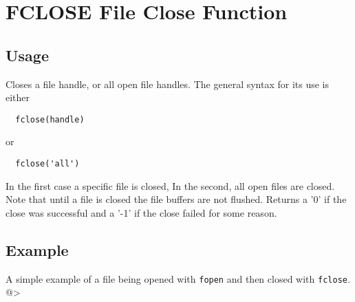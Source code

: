 \section{FCLOSE File Close Function}

\subsection{Usage}

Closes a file handle, or all open file handles.  The general syntax
for its use is either
\begin{verbatim}
  fclose(handle)
\end{verbatim}
or
\begin{verbatim}
  fclose('all')
\end{verbatim}
In the first case a specific file is closed,  In the second, all open
files are closed.  Note that until a file is closed the file buffers
are not flushed.  Returns a '0' if the close was successful and a '-1' if
the close failed for some reason.
\subsection{Example}

A simple example of a file being opened with \verb|fopen| and then closed with \verb|fclose|.
@>
